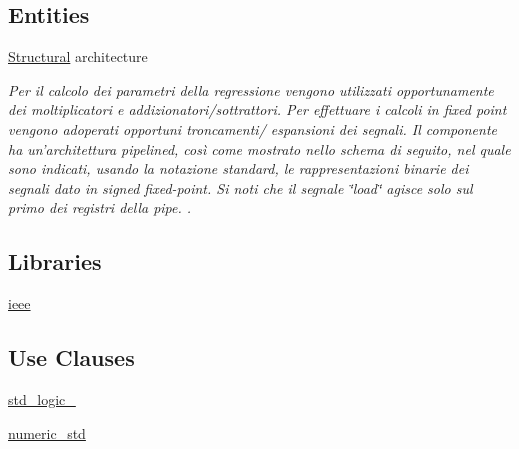 \subsection*{Entities}
\begin{DoxyCompactItemize}
\item 
\hyperlink{class_linear_regression_1_1_structural}{Structural} architecture
\begin{DoxyCompactList}\small\item\em Per il calcolo dei parametri della regressione vengono utilizzati opportunamente dei moltiplicatori e addizionatori/sottrattori. Per effettuare i calcoli in fixed point vengono adoperati opportuni troncamenti/ espansioni dei segnali. Il componente ha un'architettura pipelined, così come mostrato nello schema di seguito, nel quale sono indicati, usando la notazione standard, le rappresentazioni binarie dei segnali dato in signed fixed-\/point. Si noti che il segnale \char`\"{}load\char`\"{} agisce solo sul primo dei registri della pipe. . \end{DoxyCompactList}\end{DoxyCompactItemize}
\subsection*{Libraries}
 \begin{DoxyCompactItemize}
\item 
\hyperlink{group___linear_regression_ga0a6af6eef40212dbaf130d57ce711256}{ieee} 
\end{DoxyCompactItemize}
\subsection*{Use Clauses}
 \begin{DoxyCompactItemize}
\item 
\hyperlink{group___linear_regression_gacd03516902501cd1c7296a98e22c6fcb}{std\+\_\+logic\+\_}   
\item 
\hyperlink{group___linear_regression_ga2edc34402b573437d5f25fa90ba4013e}{numeric\+\_\+std}   
\end{DoxyCompactItemize}
